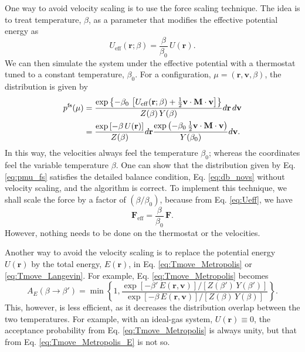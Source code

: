 \documentclass[11pt]{article}
\begin{document}
One way to avoid velocity scaling is to use the force scaling technique.
%
The idea is to treat temperature, $\beta$, as a parameter that
modifies the effective potential energy as
%
\begin{equation}
  U_\mathrm{eff}(\mathbf r; \beta)
  =
  \frac{ \beta } { \beta_0 } \,
  U(\mathbf r)
  .
\label{eq:Ueff}
\end{equation}
%
We can then simulate the system under the effective potential
with a thermostat tuned to a constant temperature, $\beta_0$.
%
For a configuration, $\mu = (\mathbf r, \mathbf v, \beta)$,
the distribution is given by
%
\begin{align}
  p^\mathrm{fs}(\mu)
  &=
  \frac{
    \exp\left\{
      -\beta_0 \,
      \left[
          U_\mathrm{eff}(\mathbf r; \beta)
          +\frac{1}{2} \mathbf v \cdot \mathbf M \cdot \mathbf v
      \right]
    \right\}
  }
  {
    Z(\beta) \, Y(\beta)
  }
  d \mathbf r \,
  d \mathbf v
  \notag
\\
  &=
  \frac{
    \exp\left[
       -\beta \, U(\mathbf r)
    \right]
  }
  {
    Z(\beta)
  }
  d \mathbf r
  \frac{
    \exp\left(
      -\beta_0 \, \frac{1}{2} \mathbf v \cdot \mathbf M \cdot \mathbf v
    \right)
  }
  {
    Y(\beta_0)
  }
  d \mathbf v
  .
\label{eq:pmu_fs}
\end{align}
%
In this way, the velocities always feel the temperature $\beta_0$;
whereas the coordinates feel the variable temperature $\beta$.
%
One can show that the distribution given by Eq. \eqref{eq:pmu_fs}
satisfies the detailed balance condition, Eq. \eqref{eq:db_novs}
without velocity scaling,
and the algorithm is correct.
%
To implement this technique, we shall scale the force by
a factor of $(\beta / \beta_0)$, because from Eq. \eqref{eq:Ueff},
we have
%
$$
\mathbf F_\mathrm{eff} = \frac{ \beta } { \beta_0 } \, \mathbf F.
$$
However, nothing needs to be done on the thermostat or the velocities.



Another way to avoid the velocity scaling is to replace
the potential energy $U(\mathbf r)$ by the total energy, $E(\mathbf r)$,
in Eq. \eqref{eq:Tmove_Metropolis} or \eqref{eq:Tmove_Langevin}.
%
For example, Eq. \eqref{eq:Tmove_Metropolis} becomes
%
\begin{equation}
  A_E(\beta \to \beta')
  =
  \min\left\{
    1,
    \frac{
      \exp[ -\beta' \, E(\mathbf r, \mathbf v) ] /
      [Z(\beta') \, Y(\beta')]
    }
    {
      \exp[ -\beta \, E(\mathbf r, \mathbf v) ] /
      [Z(\beta) \, Y(\beta)]
    }
  \right\}
  .
\label{eq:Tmove_Metropolis_E}
\end{equation}
%
This, however, is less efficient,
as it decreases the distribution overlap between the two temperatures.
%
For example, with an ideal-gas system, $U(\mathbf r) \equiv 0$,
the acceptance probability from Eq. \eqref{eq:Tmove_Metropolis}
is always unity, but that from Eq. \eqref{eq:Tmove_Metropolis_E}
is not so.




\end{document}
